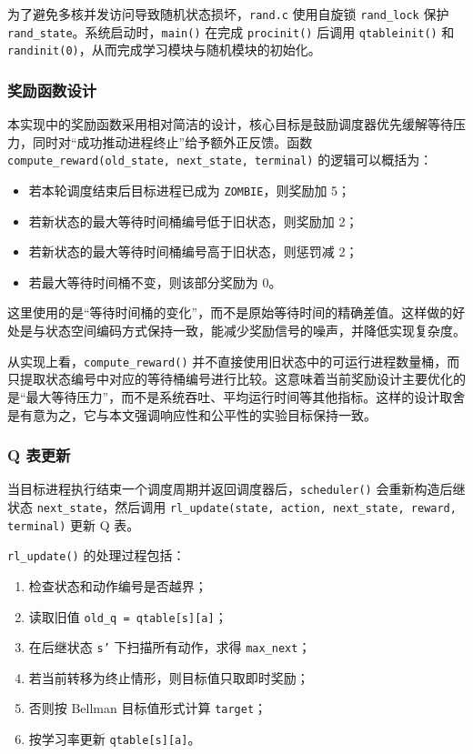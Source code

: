 为了避免多核并发访问导致随机状态损坏，\texttt{rand.c} 使用自旋锁 \texttt{rand\_lock} 保护 \texttt{rand\_state}。系统启动时，\texttt{main()} 在完成 \texttt{procinit()} 后调用 \texttt{qtableinit()} 和 \texttt{randinit(0)}，从而完成学习模块与随机模块的初始化。

\subsubsection{奖励函数设计}

本实现中的奖励函数采用相对简洁的设计，核心目标是鼓励调度器优先缓解等待压力，同时对“成功推动进程终止”给予额外正反馈。函数 \texttt{compute\_reward(old\_state, next\_state, terminal)} 的逻辑可以概括为：

\begin{itemize}
\item 若本轮调度结束后目标进程已成为 \texttt{ZOMBIE}，则奖励加 5；
\item 若新状态的最大等待时间桶编号低于旧状态，则奖励加 2；
\item 若新状态的最大等待时间桶编号高于旧状态，则惩罚减 2；
\item 若最大等待时间桶不变，则该部分奖励为 0。
\end{itemize}

这里使用的是“等待时间桶的变化”，而不是原始等待时间的精确差值。这样做的好处是与状态空间编码方式保持一致，能减少奖励信号的噪声，并降低实现复杂度。

从实现上看，\texttt{compute\_reward()} 并不直接使用旧状态中的可运行进程数量桶，而只提取状态编号中对应的等待桶编号进行比较。这意味着当前奖励设计主要优化的是“最大等待压力”，而不是系统吞吐、平均运行时间等其他指标。这样的设计取舍是有意为之，它与本文强调响应性和公平性的实验目标保持一致。

\subsubsection{Q 表更新}

当目标进程执行结束一个调度周期并返回调度器后，\texttt{scheduler()} 会重新构造后继状态 \texttt{next\_state}，然后调用 \texttt{rl\_update(state, action, next\_state, reward, terminal)} 更新 Q 表。

\texttt{rl\_update()} 的处理过程包括：

\begin{enumerate}
\item 检查状态和动作编号是否越界；
\item 读取旧值 \texttt{old\_q = qtable[s][a]}；
\item 在后继状态 \texttt{s'} 下扫描所有动作，求得 \texttt{max\_next}；
\item 若当前转移为终止情形，则目标值只取即时奖励；
\item 否则按 Bellman 目标值形式计算 \texttt{target}；
\item 按学习率更新 \texttt{qtable[s][a]}。
\end{enumerate}

